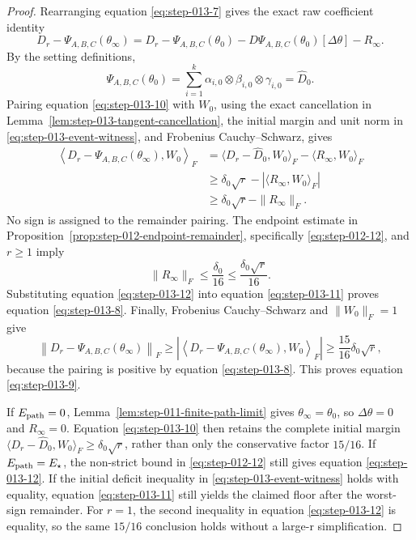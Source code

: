 \begin{proof}
Rearranging equation \eqref{eq:step-013-7} gives the exact raw
coefficient identity
\begin{equation}
  D_r-\Psi_{A,B,C}(\theta_\infty)
  =D_r-\Psi_{A,B,C}(\theta_0)
   -D\Psi_{A,B,C}(\theta_0)[\Delta\theta]-R_\infty.
  \label{eq:step-013-10}
\end{equation}
By the setting definitions,
\begin{equation}
  \Psi_{A,B,C}(\theta_0)
  =\sum_{i=1}^k\alpha_{i,0}\otimes\beta_{i,0}\otimes\gamma_{i,0}
  =\widehat D_0.
  \label{eq:step-013-initial-coefficient}
\end{equation}
Pairing equation
\eqref{eq:step-013-10} with \(W_0\), using the exact cancellation in
Lemma~\ref{lem:step-013-tangent-cancellation}, the initial margin and unit
norm in \eqref{eq:step-013-event-witness}, and Frobenius
Cauchy--Schwarz, gives
\begin{equation}
\begin{aligned}
  \left\langle D_r-\Psi_{A,B,C}(\theta_\infty),W_0\right\rangle_F
  &=\langle D_r-\widehat D_0,W_0\rangle_F
    -\langle R_\infty,W_0\rangle_F\\
  &\ge\delta_0\sqrt r-|\langle R_\infty,W_0\rangle_F|\\
  &\ge\delta_0\sqrt r-\|R_\infty\|_F.
\end{aligned}\label{eq:step-013-11}
\end{equation}
No sign is assigned to the remainder pairing. The endpoint estimate
in Proposition~\ref{prop:step-012-endpoint-remainder}, specifically
\eqref{eq:step-012-12}, and \(r\ge1\) imply
\begin{equation}
  \|R_\infty\|_F
  \le\frac{\delta_0}{16}
  \le\frac{\delta_0\sqrt r}{16}.                        \label{eq:step-013-12}
\end{equation}
Substituting equation \eqref{eq:step-013-12} into equation \eqref{eq:step-013-11} proves equation \eqref{eq:step-013-8}. Finally,
Frobenius Cauchy--Schwarz and \(\|W_0\|_F=1\) give
\[
  \left\|D_r-\Psi_{A,B,C}(\theta_\infty)\right\|_F
  \ge
  \left|\left\langle
    D_r-\Psi_{A,B,C}(\theta_\infty),W_0
  \right\rangle_F\right|
  \ge\frac{15}{16}\delta_0\sqrt r,
\]
because the pairing is positive by equation \eqref{eq:step-013-8}. This proves equation \eqref{eq:step-013-9}.

If \(E_{\rm path}=0\),
Lemma~\ref{lem:step-011-finite-path-limit} gives
\(\theta_\infty=\theta_0\), so \(\Delta\theta=0\) and
\(R_\infty=0\). Equation \eqref{eq:step-013-10} then retains the complete initial margin
\(\langle D_r-\widehat D_0,W_0\rangle_F\ge\delta_0\sqrt r\), rather than
only the conservative factor \(15/16\). If \(E_{\rm path}=E_\star\), the
non-strict bound in \eqref{eq:step-012-12} still gives equation \eqref{eq:step-013-12}. If the
initial deficit inequality in \eqref{eq:step-013-event-witness} holds with equality, equation
\eqref{eq:step-013-11} still yields the claimed floor after the worst-sign remainder. For
\(r=1\), the second inequality in equation \eqref{eq:step-013-12} is equality, so the same
\(15/16\) conclusion holds without a large-r simplification. 

\end{proof}

